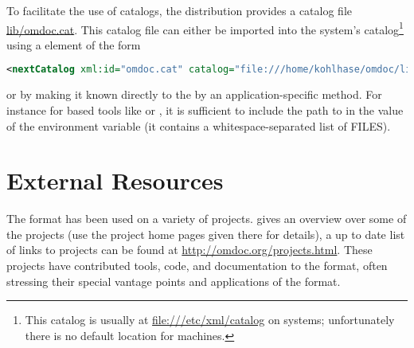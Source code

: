 To facilitate the use of catalogs, the {\omdoc} distribution provides a catalog file
\url{lib/omdoc.cat}. This catalog file can either be imported into the system's
catalog\footnote{This catalog is usually at \url{file:///etc/xml/catalog} on {\unix}
  systems; unfortunately there is no default location for {\windows} machines.} using a
{} element of the form
\begin{lstlisting}[language=XML]
<nextCatalog xml:id="omdoc.cat" catalog="file:///home/kohlhase/omdoc/lib/omdoc.cat"/>
\end{lstlisting}
or by making it known directly to the  by an
application-specific method. For instance for {} based tools like
{} or {}, it is sufficient to include the path to
{} in the value of the {} environment
variable (it contains a whitespace-separated list of FILES).


\section{External Resources}\label{sec:external-resources}
The {\omdoc} format has been used on a variety of projects. {}
gives an overview over some of the projects (use the project home pages given
there for details), a up to date list of links to {\omdoc} projects can be found
at \url{http://omdoc.org/projects.html}. These projects have
contributed tools, code, and documentation to the {\omdoc} format, often stressing
their special vantage points and applications of the format.



